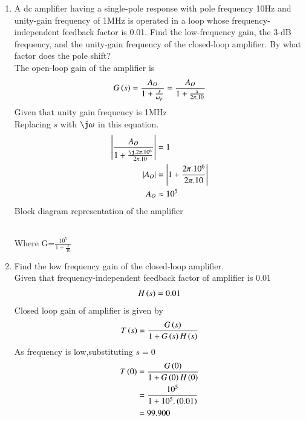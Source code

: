 \begin{enumerate}[label=\thesubsection.\arabic*.,ref=\thesubsection.\theenumi]

\item A dc amplifier having a single-pole response with pole frequency 10Hz and unity-gain frequency of 1MHz is operated in a loop whose frequency-independent feedback factor is 0.01. Find the low-frequency gain, the 3-dB frequency, and the unity-gain frequency of the closed-loop amplifier. By what factor does the pole shift?\\
\solution The open-loop gain of the amplifier is\\
\begin{align}
    G\left(s\right)=\frac{A_{O}}{1+\frac{s}{\omega_p}}=\frac{A_{O}}{1+\frac{s}{2\pi.10}}
\end{align}
Given that unity gain frequency is 1MHz\\
Replacing $s$ with $\j\omega$ in this equation.
\begin{align}
    \abs{\frac{A_{O}}{1+\frac{\j.2\pi.10^6}{2\pi.10}}}&=1\\
    \abs{A_{O}}&=\abs{1+\frac{2\pi.10^6}{2\pi.10}}\\
    A_{O}&\approx10^5
\end{align}
Block diagram representation of the amplifier
\begin{figure}[!ht]
    \begin{center}
		\resizebox{\columnwidth}{!}{}
	\end{center}
\caption{}
\label{fig:ee18btech11035_block}
\end{figure}\\
Where G=$\frac{10^5}{1+\frac{s}{10}}$

\item Find the low frequency gain of the closed-loop amplifier.\\ 
\solution Given that frequency-independent feedback factor of amplifier is 0.01\\
\begin{align}
    H\left(s\right)=0.01
\end{align}
Closed loop gain of amplifier is given by
\begin{align}
    \label{eq:ee18btech11035_T}
    T\left(s\right)=\frac{G\left(s\right)}{1+G\left(s\right)H\left(s\right)}
\end{align}
As frequency is low,substituting $s=0$\\
\begin{align}
    T\left(0\right)&=\frac{G\left(0\right)}{1+G\left(0\right)H\left(0\right)}\\
    &=\frac{10^5}{1+10^5.\left(0.01\right)}\\
    &=99.900
\end{align}


\end{enumerate}
